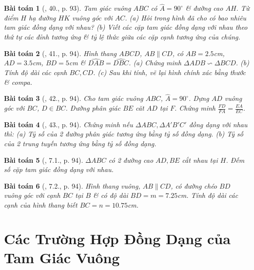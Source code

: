\documentclass{article}
\newtheorem{baitoan}{Bài toán}
\begin{document}
\begin{baitoan}[\cite{SBT_Toan_8_tap_2}, 40., p. 93]
	Tam giác vuông $ABC$ có $\widehat{A} = 90^\circ$ \& đường cao $AH$. Từ điểm $H$ hạ đường $HK$ vuông góc với $AC$. (a) Hỏi trong hình đã cho có bao nhiêu tam giác đồng dạng với nhau? (b) Viết các cặp tam giác đồng dạng với nhau theo thứ tự các đỉnh tương ứng \& tỷ lệ thức giữa các cặp cạnh tương ứng của chúng.
\end{baitoan}

\begin{baitoan}[\cite{SBT_Toan_8_tap_2}, 41., p. 94]
	 Hình thang $ABCD$, $AB\parallel CD$, có $AB = 2.5$\emph{cm}, $AD = 3.5$\emph{cm}, $BD = 5$\emph{cm} \& $\widehat{DAB} = \widehat{DBC}$. (a) Chứng minh $\Delta ADB\backsim\Delta BCD$. (b) Tính độ dài các cạnh $BC,CD$. (c) Sau khi tính, vẽ lại hình chính xác bằng thước \& compa.
\end{baitoan}

\begin{baitoan}[\cite{SBT_Toan_8_tap_2}, 42., p. 94]
	Cho tam giác vuông $ABC$, $\widehat{A} = 90^\circ$. Dựng $AD$ vuông góc với $BC$, $D\in BC$. Đường phân giác $BE$ căt $AD$ tại $F$. Chứng minh $\frac{FD}{FA} = \frac{EA}{EC}$.
\end{baitoan}

\begin{baitoan}[\cite{SBT_Toan_8_tap_2}, 43., p. 94]
	Chứng minh nếu $\Delta ABC,\Delta A'B'C'$ đồng dạng với nhau thì: (a) Tỷ số của 2 đường phân giác tương ứng bằng tỷ số đồng dạng. (b) Tỷ số của 2 trung tuyến tương ứng bằng tỷ số đồng dạng.	
\end{baitoan}

\begin{baitoan}[\cite{SBT_Toan_8_tap_2}, 7.1., p. 94]
	$\Delta ABC$ có 2 đường cao $AD,BE$ cắt nhau tại $H$. Đếm số cặp tam giác đồng dạng với nhau.
\end{baitoan}

\begin{baitoan}[\cite{SBT_Toan_8_tap_2}, 7.2., p. 94]
	Hình thang vuông, $AB\parallel CD$, có đường chéo $BD$ vuông góc với cạnh $BC$ tại $B$ \& có độ dài $BD = m = 7.25$\emph{cm}. Tính độ dài các cạnh của hình thang biết $BC = n = 10.75$\emph{cm}.
\end{baitoan}


\section{Các Trường Hợp Đồng Dạng của Tam Giác Vuông}
\end{document}
